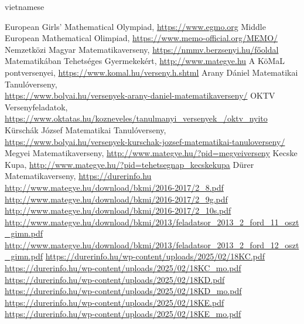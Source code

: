 \documentclass{article}
\begin{document}
\begin{otherlanguage*}{vietnamese}
\begin{thebibliography}{99}
     European Girls’ Mathematical Olympiad, \url{https://www.egmo.org}
     Middle European Mathematical Olimpiad, \url{https://www.memo-official.org/MEMO/}
     Nemzetközi Magyar Matematikaverseny, \url{https://nmmv.berzsenyi.hu/főoldal}
     Matematikában Tehetséges Gyermekekért, \url{http://www.mategye.hu}
     A KöMaL pontversenyei, \url{https://www.komal.hu/verseny.h.shtml}
     Arany Dániel Matematikai Tanulóverseny,\\ \url{https://www.bolyai.hu/versenyek-arany-daniel-matematikaverseny/}
     OKTV Versenyfeladatok,\\ \url{https://www.oktatas.hu/kozneveles/tanulmanyi_versenyek_/oktv_nyito}
     Kürschák József Matematikai Tanulóverseny,\\ \url{https://www.bolyai.hu/versenyek-kurschak-jozsef-matematikai-tanuloverseny/}
     Megyei Matematikaverseny, \url{http://www.mategye.hu/?pid=megyeiverseny}
     Kecske Kupa, \url{http://www.mategye.hu/?pid=tehetsegnap_kecskekupa}
     Dürer Matematikaverseny, \url{https://durerinfo.hu}
     \url{http://www.mategye.hu/download/bkmi/2016-2017/2_8.pdf}
     \url{http://www.mategye.hu/download/bkmi/2016-2017/2_9g.pdf}
     \url{http://www.mategye.hu/download/bkmi/2016-2017/2_10s.pdf}
     \url{http://www.mategye.hu/download/bkmi/2013/feladatsor_2013_2_ford_11_oszt_gimn.pdf}
     \url{http://www.mategye.hu/download/bkmi/2013/feladatsor_2013_2_ford_12_oszt_gimn.pdf}
     \url{https://durerinfo.hu/wp-content/uploads/2025/02/18KC.pdf}
     \url{https://durerinfo.hu/wp-content/uploads/2025/02/18KC_mo.pdf}
     \url{https://durerinfo.hu/wp-content/uploads/2025/02/18KD.pdf}
     \url{https://durerinfo.hu/wp-content/uploads/2025/02/18KD_mo.pdf}
     \url{https://durerinfo.hu/wp-content/uploads/2025/02/18KE.pdf}
     \url{https://durerinfo.hu/wp-content/uploads/2025/02/18KE_mo.pdf}
\end{thebibliography}

\end{otherlanguage*}
\end{document}
